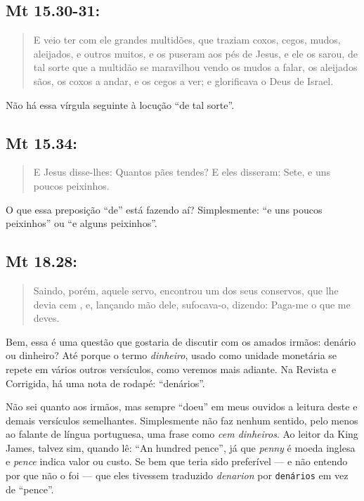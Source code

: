 \subsection*{Mt 15.30-31:}
\begin{quote}
\small
E veio ter com ele grandes multidões, que traziam coxos, cegos, mudos, aleijados, e outros muitos, e os puseram aos pés de Jesus, e ele os sarou, de tal sorte\uwave{,} que a multidão se maravilhou vendo os mudos a falar, os aleijados sãos, os coxos a andar, e os cegos a ver; e glorificava o Deus de Israel.
\end{quote}

Não há essa vírgula seguinte à locução ``de tal sorte''.

\subsection*{Mt 15.34:}
\begin{quote}
 \small
 E Jesus disse-lhes: Quantos pães tendes? E eles disseram: Sete, e uns poucos  peixinhos.
\end{quote}

O que essa preposição ``de'' está fazendo aí? Simplesmente: ``e uns poucos peixinhos'' ou ``e alguns peixinhos''.

\subsection*{Mt 18.28:}\label{denario}
\begin{quote}
 \small
Saindo, porém, aquele servo, encontrou um dos seus
conservos, que lhe devia cem , e, lançando mão dele, sufocava-o, dizendo: Paga-me o que me deves.
\end{quote}

Bem, essa é uma questão que gostaria de discutir com os amados irmãos:
denário ou dinheiro? Até porque o termo \emph{dinheiro}, usado como
unidade monetária se repete em vários outros versículos, como veremos
mais adiante. Na Revista e Corrigida, há uma nota de rodapé:
``denários''.

Não sei quanto aos irmãos, mas sempre ``doeu'' em meus ouvidos a
leitura deste e demais versículos semelhantes. Simplesmente não faz
nenhum sentido, pelo menos ao falante de língua portuguesa, uma frase
como \emph{cem dinheiros}. Ao leitor da King James, talvez sim, quando
lê: ``An hundred pence'', já que \emph{penny} é moeda inglesa e
\emph{pence} indica valor ou custo. Se bem que teria sido preferível
--- e não entendo por que não o foi --- que eles tivessem traduzido
\emph{denarion} por \texttt{denários} em vez de ``pence''.

